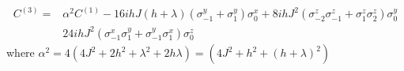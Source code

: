 \documentclass[11pt,a4paper]{article}
\begin{document}
\begin{align*}
C^{(3)}= & \alpha^2 C^{(1)}-16 i   h J (h + \lambda)  (\sigma _{-1}^y + \sigma_1^y)\sigma _{0}^x + 8 i hJ^2( \sigma _{-2}^z\sigma _{-1}^z + \sigma _{1}^z\sigma _{2}^z) \sigma _{0}^y  \\
&   24 i h J^2 (\sigma _{-1}^x\sigma _{1}^y + \sigma _{-1}^y\sigma _{1}^x)\sigma _{0}^z  
\end{align*}
where $\alpha^2 =4 (4 J^2 + 2 h^2 + \lambda^2 + 2 h \lambda)= (4 J^2 +  h^2 + (h + \lambda)^2 )$

 


\end{document}
